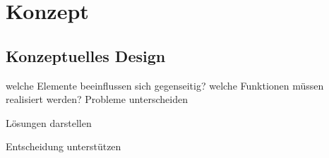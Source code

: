 \chapter{Konzept}
\label{sec:Konzept}





\section{Konzeptuelles Design}
welche Elemente beeinflussen sich gegenseitig?
welche Funktionen müssen realisiert werden?
Probleme unterscheiden

Lösungen darstellen

Entscheidung unterstützen


